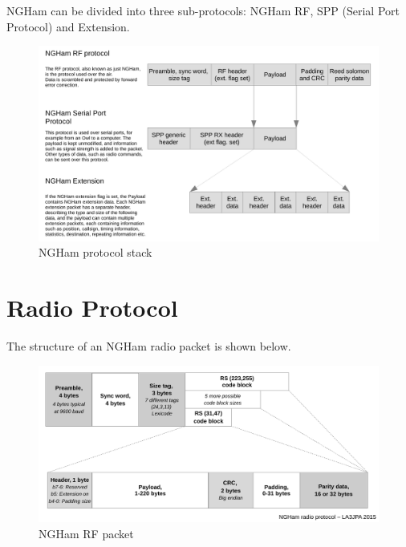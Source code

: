 \documentclass[a4paper, english, 12pt, hidelinks]{article}
\begin{document}
    NGHam can be divided into three sub-protocols: NGHam RF, SPP (Serial Port Protocol) and Extension.
    \\[0.2cm]
    \begin{figure}[H]
	    \centering
	    \includegraphics[width = \textwidth, trim=0cm 0cm 0cm 0cm, clip]{img/ngham_protocol_stack.pdf}
	    \caption{NGHam protocol stack}
	    \label{fig:ngham_stack}
    \end{figure}

	\clearpage

\section{Radio Protocol}
    The structure of an NGHam radio packet is shown below.

    \begin{figure}[H]
	    \centering
	    \includegraphics[width = \textwidth, trim=0cm 0cm 0cm 0cm, clip]{img/ngham_block_v4.pdf}
	    \caption{NGHam RF packet}
	    \label{fig:ngham_rf_packet}
    \end{figure}
\end{document}
